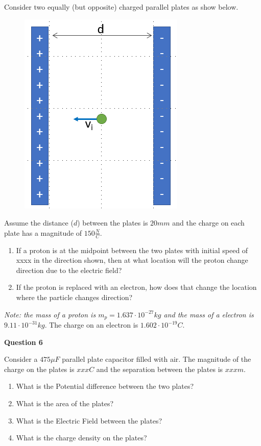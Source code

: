 \documentclass[14pt]{report}
\begin{document}
Consider two equally (but opposite) charged parallel plates as show below.

\begin{figure}[H]
\begin{center}
\includegraphics[scale=0.40]{exam1_6.png}
\end{center}
\end{figure}

Assume the distance ($d$) between the plates is $20mm$ and the charge on each plate has a magnitude of $150 \frac{N}{C}$. 



\begin{enumerate}[label=\Alph*]
\item If a proton is at the midpoint between the two plates with initial speed of xxxx in the direction shown, then at what location will the proton change direction due to the electric field?
\item If the proton is replaced with an electron, how does that change the location where the particle changes direction?
\end{enumerate}

\textit{Note: the mass of a proton is $m_p = 1.637 \cdot 10^{-27} kg$ and the mass of a electron is $9.11 \cdot 10^{-31} kg$}. The charge on an electron is $1.602 \cdot 10^{-19} C$.

\textbf{Question 6}

Consider a $475 \mu F$ parallel plate capacitor filled with air. The magnitude of the charge on the plates is $xxx C$ and the separation between the plates is $xxx m$.

\begin{enumerate}[label=\Alph*]
\item What is the Potential difference between the two plates?
\item What is the area of the plates?
\item What is the Electric Field between the plates?
\item What is the charge density on the plates?
\end{enumerate}
\end{document}
